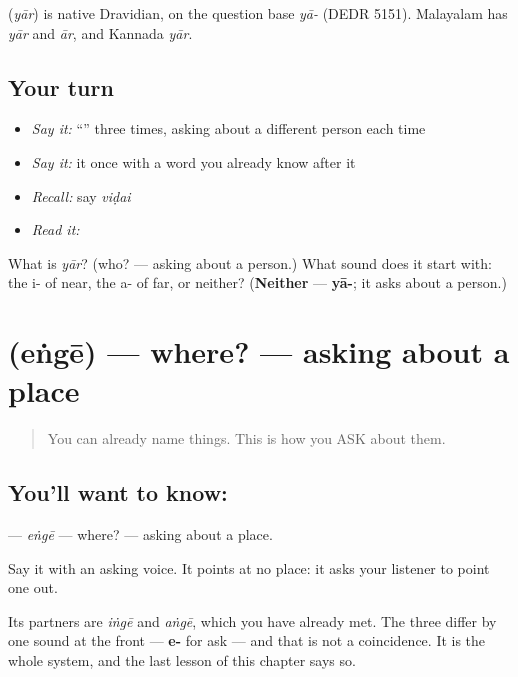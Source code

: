 \begin{cousinweb}
\textbf{} (\emph{yār}) is native Dravidian, on the question base \emph{yā-} (DEDR 5151). Malayalam has \emph{yār} and \emph{ār}, and Kannada \emph{yār}.
\end{cousinweb}

\subsection*{Your turn}
\begin{itemize}
\raggedright
  \item \emph{Say it:} \textquotedblleft{}\textquotedblright{} three times, asking about a different person each time
  \item \emph{Say it:} it once with a word you already know after it
  \item \emph{Recall:} say \emph{viḍai}
  \item \emph{Read it:} \textbf{}
\end{itemize}

\begin{tcolorbox}[breakable,colback=teal!4,colframe=teal!35!black,title={Before you move on}]
What is \emph{yār}? (who? — asking about a person.) What sound does it start with: the i- of near, the a- of far, or neither? (\textbf{Neither} — \textbf{yā-}; it asks about a person.)
\end{tcolorbox}
\section[\texorpdfstring{\ta{எங்கே} (eṅgē)}{எங்கே (eṅgē)}]{ (eṅgē) — where? — asking about a place}

\label{lesson:TA-C40-where}



\begin{quote}
You can already name things. This is how you ASK about them.
\end{quote}

\subsection*{You'll want to know: }
\textbf{} — \emph{eṅgē} — where? — asking about a place.

Say it with an asking voice. It points at no place: it asks your listener to point one out.

Its partners are \textbf{} \emph{iṅgē} and \textbf{} \emph{aṅgē}, which you have already met. The three differ by one sound at the front — \textbf{e-} for ask — and that is not a coincidence. It is the whole system, and the last lesson of this chapter says so.


